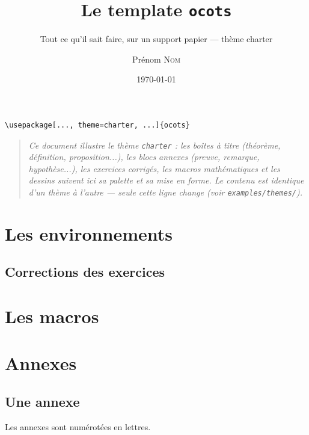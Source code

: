 \documentclass[11pt,twoside]{ocots-book}
\title{Le template \texttt{ocots}}
\subtitle{Tout ce qu'il sait faire, sur un support papier --- thème charter}
\author{Prénom \textsc{Nom}}
\date{\today}
\begin{document}
\dominitoc%

\frontmatter%
\maketitle

\begin{lstlisting}
\usepackage[..., theme=charter, ...]{ocots}
\end{lstlisting}
\begin{quote}\itshape
Ce document illustre le th\`eme \texttt{charter} : les bo\^ites \`a titre
(th\'eor\`eme, d\'efinition, proposition...), les blocs annexes (preuve,
remarque, hypoth\`ese...), les exercices corrig\'es, les macros
math\'ematiques et les dessins suivent ici sa palette et sa mise en forme.
Le contenu est identique d'un th\`eme \`a l'autre --- seule cette ligne
change (voir \texttt{examples/themes/}).
\end{quote}

\tableofcontents

\mainmatter%

\part{Les environnements}%
\label{part:env}

\ocotscollectsolutions%





\chapter{Corrections des exercices}%
\label{chap:solutions}
\ocotsprintsolutions%

\part{Les macros}%
\label{part:macros}




\part{Annexes}%
\label{part:appendix}

\begin{appendix}
    \chapter{Une annexe}%
    \label{chap:appendix}
    \minitoc%

    Les annexes sont numérotées en lettres.
\end{appendix}

\backmatter%
\printindex%
\end{document}
